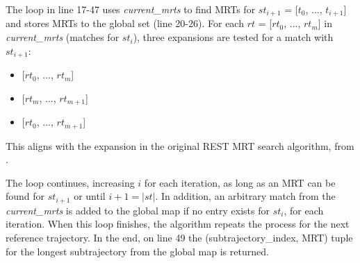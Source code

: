 The loop in line 17-47 uses \textit{current\_mrts} to find MRTs for $st_{i+1}$ = [$t_0$, ..., $t_{i+1}$] and stores MRTs to the global set (line 20-26). For each $rt$ = [$rt_0$, ..., $rt_m$] in \textit{current\_mrts} (matches for $st_i$), three expansions are tested for a match with $st_{i+1}$:
\begin{itemize}
    \item {[$rt_0$, ..., $rt_m$]}
    \item {[$rt_m$, ..., $rt_{m+1}$]}
    \item {[$rt_0$, ..., $rt_{m+1}$]}
\end{itemize}
This aligns with the expansion in the original REST MRT search algorithm, from \textcite{zhao2018rest}.

The loop continues, increasing $i$ for each iteration, as long as an MRT can be found for $st_{i+1}$ or until $i + 1 = |st|$. In addition, an arbitrary match from the \textit{current\_mrts} is added to the global map if no entry exists for $st_{i}$, for each iteration. When this loop finishes, the algorithm repeats the process for the next reference trajectory. In the end, on line 49 the (subtrajectory\_index, MRT) tuple for the longest subtrajectory from the global map is returned.


